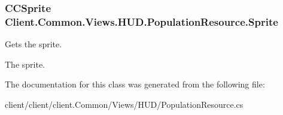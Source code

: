 \subsubsection[{Sprite}]{\setlength{\rightskip}{0pt plus 5cm}C\+C\+Sprite Client.\+Common.\+Views.\+H\+U\+D.\+Population\+Resource.\+Sprite\hspace{0.3cm}{\ttfamily [get]}}\label{classClient_1_1Common_1_1Views_1_1HUD_1_1PopulationResource_aca81efbdba7d65cb6bc7946ef94b0520}


Gets the sprite. 

The sprite.

The documentation for this class was generated from the following file\+:\begin{DoxyCompactItemize}
\item 
client/client/client.\+Common/\+Views/\+H\+U\+D/Population\+Resource.\+cs\end{DoxyCompactItemize}
